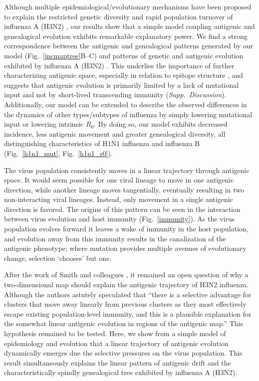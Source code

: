 Although multiple epidemiological/evolutionary mechanisms have been proposed to explain the restricted genetic diversity and rapid population turnover of influenza A (H3N2) \cite{Ferguson03,Tria05,Koelle06,Recker07}, our results show that a simple model coupling antigenic and genealogical evolution exhibits remarkable explanatory power.  We find a strong correspondence between the antigenic and genealogical patterns generated by our model (Fig.~\ref{incmaptree}B--C) and patterns of genetic and antigenic evolution exhibited by influenza A (H3N2) \cite{Fitch97,Smith04}.  This underlies the importance of further characterizing antigenic space, especially in relation to epitope structure \cite{Recker07}, and suggests that antigenic evolution is primarily limited by a lack of mutational input and not by short-lived transcending immunity (\textsl{Supp.~Discussion}).  Additionally, our model can be extended to describe the observed differences in the dynamics of other types/subtypes of influenza by simply lowering mutational input or lowering intrinsic $R_0$.  By doing so, our model exhibits decreased incidence, less antigenic movement and greater genealogical diversity, all distinguishing characteristics of H1N1 influenza and influenza B (Fig.~\ref{h1n1_mut}, Fig.~\ref{h1n1_r0}).

The virus population consistently moves in a linear trajectory through antigenic space.  It would seem possible for one viral lineage to move in one antigenic direction, while another lineage moves tangentially, eventually resulting in two non-interacting viral lineages.  Instead, only movement in a single antigenic direction is favored.  The origins of this pattern can be seen in the interaction between virus evolution and host immunity (Fig.~\ref{immunity}).  As the virus population evolves forward it leaves a wake of immunity in the host population, and evolution away from this immunity results in the canalization of the antigenic phenotype; where mutation provides multiple avenues of evolutionary change, selection `chooses' but one.  

After the work of Smith and colleagues \cite{Smith04}, it remained an open question of why a two-dimensional map should explain the antigenic trajectory of H3N2 influenza.  Although the authors astutely speculated that ``there is a selective advantage for clusters that move away linearly from previous clusters as they most effectively escape existing population-level immunity, and this is a plausible explanation for the somewhat linear antigenic evolution in regions of the antigenic map.''  This hypothesis remained to be tested.  Here, we show from a simple model of epidemiology and evolution that a linear trajectory of antigenic evolution dynamically emerges due the selective pressures on the virus population.  This result simultaneously explains the linear pattern of antigenic drift \cite{Smith04} and the characteristically spindly genealogical tree \cite{Fitch97} exhibited by influenza A (H3N2).

